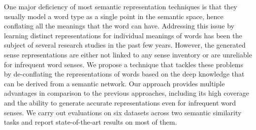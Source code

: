 One major deficiency of most semantic representation techniques is that they usually model a word type as a single point in the semantic space, hence conflating all the meanings that the word can have.  Addressing this issue by learning  distinct  representations  for  individual meanings of words has been the subject of several research studies in the past few years. However, the generated sense representations are either not linked to any sense inventory or are unreliable for infrequent word senses. We propose  a  technique  that tackles  these                          problems              by        de-conflating the representations  of words based on the deep knowledge that can be derived from a semantic network.  Our approach provides multiple advantages in comparison to the previous approaches, including its  high  coverage  and  the  ability  to  generate accurate representations  even  for  infrequent word senses.  We carry out evaluations on six datasets across two semantic similarity tasks and report state-of-the-art results on most of them.
